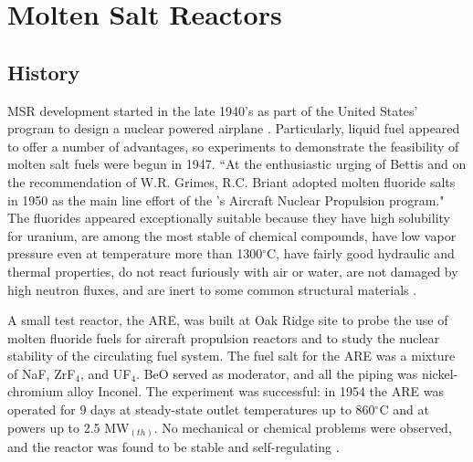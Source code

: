 \chapter[Molten Salt Reactors]{Molten Salt Reactors}


\section{History}
\gls{MSR} development started in the late 1940's as part of the United States' program to design a nuclear powered airplane \cite{bettis_aircraft_1957}. Particularly, liquid fuel appeared to offer a number of advantages, so experiments to demonstrate the feasibility of molten salt fuels were begun in 1947. ``At the enthusiastic urging of Bettis and on the recommendation of W.R. Grimes, R.C. Briant adopted molten fluoride salts in 1950 as the main line effort of the 's Aircraft Nuclear Propulsion program." The fluorides appeared exceptionally suitable because they have high solubility for uranium, are among the most stable of chemical compounds, have low vapor pressure even at temperature more than 1300$^{\circ}$C, have fairly good hydraulic and thermal properties, do not react furiously with air or water, are not damaged by high neutron fluxes, and are inert to some common structural materials \cite{rosenthal_molten-salt_1970}.

A small test reactor, the \gls{ARE}, was built at Oak Ridge site to probe the use of molten fluoride fuels for aircraft propulsion reactors and to study the nuclear stability of the circulating fuel system. The fuel salt for the \gls{ARE} was a mixture of NaF, ZrF$_4$, and UF$_4$. BeO served as moderator, and all the piping was nickel-chromium alloy Inconel. The experiment was successful: in 1954 the \gls{ARE} was operated for 9 days at steady-state outlet temperatures up to 860$^{\circ}$C and at powers up to 2.5 MW$_{(th)}$. No mechanical or chemical problems were observed, and the reactor was found to be stable and self-regulating \cite{bettis_aircraft_1957}.

